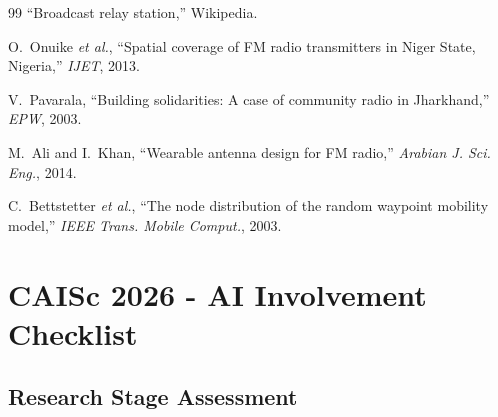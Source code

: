 \documentclass{article}
\begin{document}
{\begin{thebibliography}{99}
``Broadcast relay station,'' Wikipedia.

O.~Onuike \emph{et al.}, ``Spatial coverage of FM radio transmitters in Niger State, Nigeria,'' \emph{IJET}, 2013.

V.~Pavarala, ``Building solidarities: A case of community radio in Jharkhand,'' \emph{EPW}, 2003.

M.~Ali and I.~Khan, ``Wearable antenna design for FM radio,'' \emph{Arabian J. Sci. Eng.}, 2014.

C.~Bettstetter \emph{et al.}, ``The node distribution of the random waypoint mobility model,'' \emph{IEEE Trans. Mobile Comput.}, 2003.

\end{thebibliography}
}

\newpage

\section*{CAISc 2026 - AI Involvement Checklist}
\label{checklist_ai_involvement}

\subsection*{Research Stage Assessment}
\end{document}
